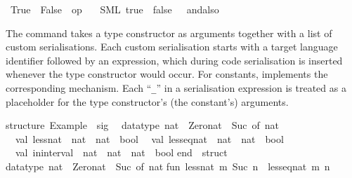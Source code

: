 \begin{isabellebody}
\ True\ \ False\ \ {\isachardoublequoteopen}op\ {\isasymand}{\isachardoublequoteclose}\isanewline
\ \ {\isacharparenleft}SML\ {\isachardoublequoteopen}true{\isachardoublequoteclose}\ \ {\isachardoublequoteopen}false{\isachardoublequoteclose}\ \ {\isachardoublequoteopen}{\isacharunderscore}\ andalso\ {\isacharunderscore}{\isachardoublequoteclose}{\isacharparenright}%
\endisatagquotett
{\isafoldquotett}%
%
\isadelimquotett
%
\endisadelimquotett
%
\begin{isamarkuptext}%
\noindent The \hypertarget{command.code-type}{\hyperlink{command.code-type}{\mbox{}}} command takes a type constructor
  as arguments together with a list of custom serialisations.  Each
  custom serialisation starts with a target language identifier
  followed by an expression, which during code serialisation is
  inserted whenever the type constructor would occur.  For constants,
  \hypertarget{command.code-const}{\hyperlink{command.code-const}{\mbox{}}} implements the corresponding mechanism.  Each
  ``\verb|_|'' in a serialisation expression is treated as a
  placeholder for the type constructor's (the constant's) arguments.%
\end{isamarkuptext}%
\isamarkuptrue%
%
\isadelimquotetypewriter
%
\endisadelimquotetypewriter
%
\isatagquotetypewriter
%
\begin{isamarkuptext}%
structure\ Example\ {\isacharcolon}\ sig\isanewline
\ \ datatype\ nat\ {\isacharequal}\ Zero{\isacharunderscore}nat\ {\isacharbar}\ Suc\ of\ nat\isanewline
\ \ val\ less{\isacharunderscore}nat\ {\isacharcolon}\ nat\ {\isacharminus}{\isachargreater}\ nat\ {\isacharminus}{\isachargreater}\ bool\isanewline
\ \ val\ less{\isacharunderscore}eq{\isacharunderscore}nat\ {\isacharcolon}\ nat\ {\isacharminus}{\isachargreater}\ nat\ {\isacharminus}{\isachargreater}\ bool\isanewline
\ \ val\ in{\isacharunderscore}interval\ {\isacharcolon}\ nat\ {\isacharasterisk}\ nat\ {\isacharminus}{\isachargreater}\ nat\ {\isacharminus}{\isachargreater}\ bool\isanewline
end\ {\isacharequal}\ struct\isanewline
\isanewline
datatype\ nat\ {\isacharequal}\ Zero{\isacharunderscore}nat\ {\isacharbar}\ Suc\ of\ nat{\isacharsemicolon}\isanewline
\isanewline
fun\ less{\isacharunderscore}nat\ m\ {\isacharparenleft}Suc\ n{\isacharparenright}\ {\isacharequal}\ less{\isacharunderscore}eq{\isacharunderscore}nat\ m\ n\isanewline

\end{isamarkuptext}
\end{isabellebody}
